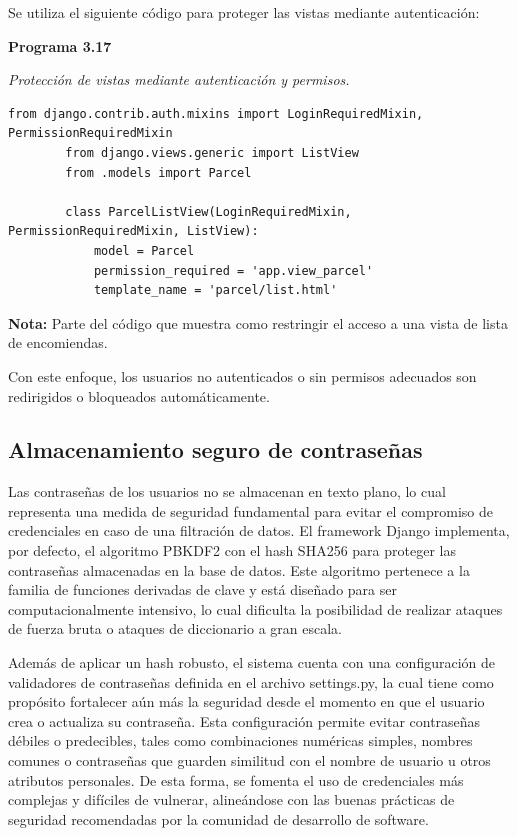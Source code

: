 	Se utiliza el siguiente código para proteger las vistas mediante autenticación:
	
	\textbf{Programa 3.17}
	
	\textit{Protección de vistas mediante autenticación y permisos.} %
	\vspace{0.3cm} %
	\begin{lstlisting}[lineskip=-1pt]
		from django.contrib.auth.mixins import LoginRequiredMixin, PermissionRequiredMixin
		from django.views.generic import ListView
		from .models import Parcel
		
		class ParcelListView(LoginRequiredMixin, PermissionRequiredMixin, ListView):
			model = Parcel
			permission_required = 'app.view_parcel'
			template_name = 'parcel/list.html'
	\end{lstlisting}
	
	\textbf{Nota:} Parte del código que muestra como restringir el acceso a una vista de lista de encomiendas.

	Con este enfoque, los usuarios no autenticados o sin permisos adecuados son redirigidos o bloqueados automáticamente.
	
\subsection{Almacenamiento seguro de contraseñas}
	
	Las contraseñas de los usuarios no se almacenan en texto plano, lo cual representa una medida de seguridad fundamental para evitar el compromiso de credenciales en caso de una filtración de datos. El framework Django implementa, por defecto, el algoritmo PBKDF2 con el hash SHA256 para proteger las contraseñas almacenadas en la base de datos. Este algoritmo pertenece a la familia de funciones derivadas de clave y está diseñado para ser computacionalmente intensivo, lo cual dificulta la posibilidad de realizar ataques de fuerza bruta o ataques de diccionario a gran escala.
	
	Además de aplicar un hash robusto, el sistema cuenta con una configuración de validadores de contraseñas definida en el archivo settings.py, la cual tiene como propósito fortalecer aún más la seguridad desde el momento en que el usuario crea o actualiza su contraseña. Esta configuración permite evitar contraseñas débiles o predecibles, tales como combinaciones numéricas simples, nombres comunes o contraseñas que guarden similitud con el nombre de usuario u otros atributos personales. De esta forma, se fomenta el uso de credenciales más complejas y difíciles de vulnerar, alineándose con las buenas prácticas de seguridad recomendadas por la comunidad de desarrollo de software.
	
